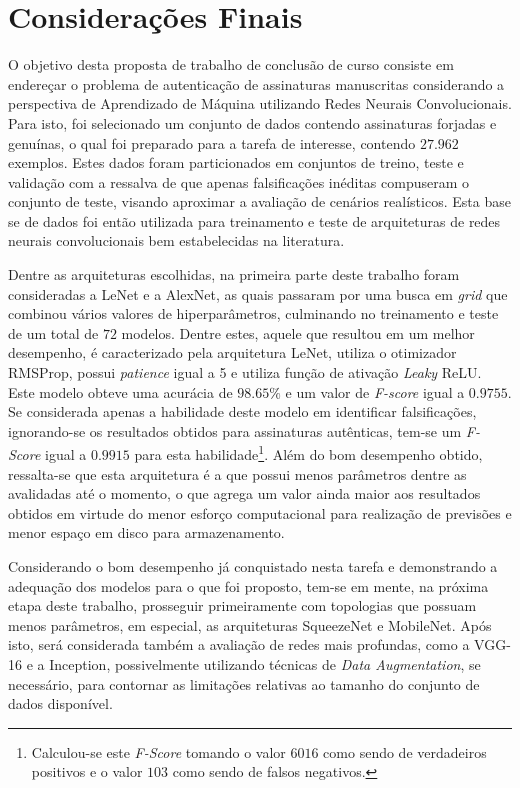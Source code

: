 
\chapter{Considerações Finais} \label{cap:consideracoes}

O objetivo desta proposta de trabalho de conclusão de curso consiste em endereçar o problema de autenticação de assinaturas manuscritas considerando a perspectiva de Aprendizado de Máquina utilizando Redes Neurais Convolucionais. Para isto, foi selecionado um conjunto de dados contendo assinaturas forjadas e genuínas, o qual foi preparado para a tarefa de interesse, contendo $27.962$ exemplos. Estes dados foram particionados em conjuntos de treino, teste e validação com a ressalva de que apenas falsificações inéditas compuseram o conjunto de teste, visando aproximar a avaliação de cenários realísticos. Esta base se de dados foi então utilizada para treinamento e teste de arquiteturas de redes neurais convolucionais bem estabelecidas na literatura.

Dentre as arquiteturas escolhidas, na primeira parte deste trabalho foram consideradas a LeNet e a AlexNet, as quais passaram por uma busca em \emph{grid} que combinou vários valores de hiperparâmetros, culminando no treinamento e teste de um total de $72$ modelos. Dentre estes, aquele que resultou em um melhor desempenho, é caracterizado pela arquitetura LeNet, utiliza o otimizador RMSProp, possui \emph{patience} igual a 5 e utiliza função de ativação \emph{Leaky} ReLU. Este modelo obteve uma acurácia de $98.65\%$ e um valor de \emph{F-score} igual a $0.9755$. Se considerada apenas a habilidade deste modelo em identificar falsificações, ignorando-se os resultados obtidos para assinaturas autênticas, tem-se um \emph{F-Score} igual a $0.9915$ para esta habilidade\footnote{Calculou-se este \emph{F-Score} tomando o valor $6016$ como sendo de verdadeiros positivos e o valor $103$ como sendo de falsos negativos.}. Além do bom desempenho obtido, ressalta-se que esta arquitetura é a que possui menos parâmetros dentre as avalidadas até o momento, o que agrega um valor ainda maior aos resultados obtidos em virtude do menor esforço computacional para realização de previsões e menor espaço em disco para armazenamento.

Considerando o bom desempenho já conquistado nesta tarefa e demonstrando a adequação dos modelos para o que foi proposto, tem-se em mente, na próxima etapa deste trabalho, prosseguir primeiramente com topologias que possuam menos parâmetros, em especial, as arquiteturas SqueezeNet e MobileNet. Após isto, será considerada também a avaliação de redes mais profundas, como a VGG-16 e a Inception, possivelmente utilizando técnicas de \emph{Data Augmentation}, se necessário, para contornar as limitações relativas ao tamanho do conjunto de dados disponível.

